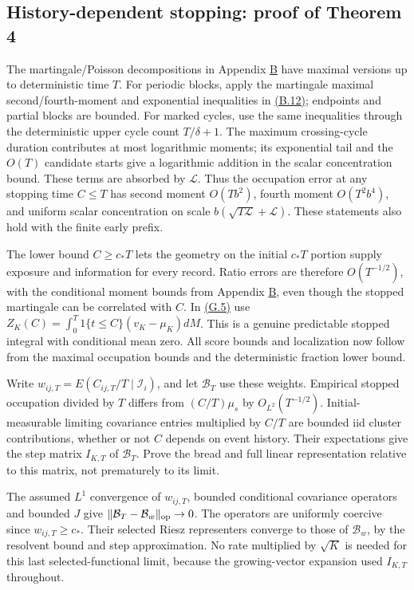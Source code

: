 \documentclass[11pt]{article}
\begin{document}
\subsection{History-dependent stopping: proof of Theorem 4}\label{sec:G.6}

The martingale/Poisson decompositions in Appendix \hyperref[sec:B]{B} have maximal versions up to deterministic time \(T\). For periodic blocks, apply the martingale maximal second/fourth-moment and exponential inequalities in \hyperref[eq:B.12]{(B.12)}; endpoints and partial blocks are bounded. For marked cycles, use the same inequalities through the deterministic upper cycle count \(T/\delta+1\). The maximum crossing-cycle duration contributes at most logarithmic moments; its exponential tail and the \(O(T)\) candidate starts give a logarithmic addition in the scalar concentration bound. These terms are absorbed by \(\mathscr L\). Thus the occupation error at any stopping time \(C\leq T\) has second moment \(O(Tb^2)\), fourth moment \(O(T^2b^4)\), and uniform scalar concentration on scale \(b(\sqrt{T\mathscr L}+\mathscr L)\). These statements also hold with the finite early prefix.

The lower bound \(C\geq c_*T\) lets the geometry on the initial \(c_*T\) portion supply exposure and information for every record. Ratio errors are therefore \(O(T^{-1/2})\), with the conditional moment bounds from Appendix \hyperref[sec:B]{B}, even though the stopped martingale can be correlated with \(C\). In \hyperref[eq:G.5]{(G.5)} use
\(Z_K(C)=\int_0^T1\{t\leq C\}(v_K-\mu_K)dM\).
This is a genuine predictable stopped integral with conditional mean zero. All score bounds and localization now follow from the maximal occupation bounds and the deterministic fraction lower bound.

Write \(w_{ij,T}=E(C_{ij,T}/T\mid\mathcal I_i)\), and let \(\mathcal B_T\) use these weights. Empirical stopped occupation divided by \(T\) differs from
\((C/T)\mu_s\) by \(O_{L^2}(T^{-1/2})\). Initial-measurable limiting covariance entries multiplied by \(C/T\) are bounded iid cluster contributions, whether or not \(C\) depends on event history. Their expectations give the step matrix \(I_{K,T}\) of \(\mathcal B_T\). Prove the bread and full linear representation relative to this matrix, not prematurely to its limit.

The assumed \(L^1\) convergence of \(w_{ij,T}\), bounded conditional covariance operators and bounded \(J\) give
\(\|\mathcal B_T-\mathcal B_w\|_{\rm op}\to0\).
The operators are uniformly coercive since \(w_{ij,T}\geq c_*\). Their selected Riesz representers converge to those of \(\mathcal B_w\), by the resolvent bound and step approximation. No rate multiplied by \(\sqrt K\) is needed for this last selected-functional limit, because the growing-vector expansion used \(I_{K,T}\) throughout.
\end{document}
